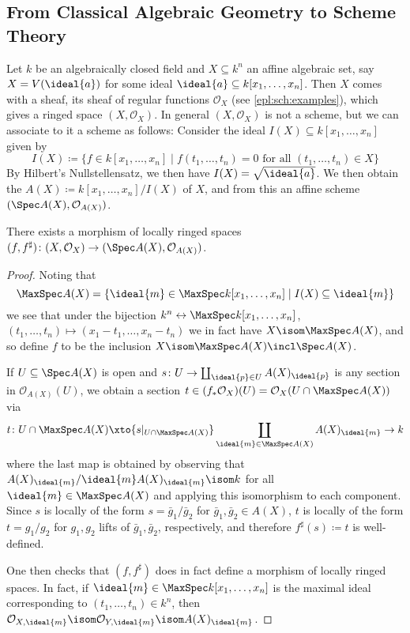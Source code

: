 \documentclass[wip, algebra]{bsteffan-lecturenotes}
\newcommand{\cO}{\mathcal{O}}
\begin{document}
\subsection{From Classical Algebraic Geometry to Scheme Theory}
Let $k$ be an algebraically closed field and $X \subseteq k^n$ an affine algebraic set, say $X = V(\ideal{a})$ for some ideal $\ideal{a} \subseteq k[x_1, \ldots, x_n]$.
Then $X$ comes with a sheaf, its sheaf of regular functions $\cO_X$ (see \cref{epl:sch:examples}), which gives a ringed space $(X, \cO_X)$.
In general $(X, \cO_X)$ is not a scheme, but we can associate to it a scheme as follows:
Consider the ideal $I(X) \subseteq k[x_1, \ldots, x_n]$ given by 
\begin{equation*}
	I(X) \coloneq \{f \in k[x_1, \ldots, x_n] \mid f(t_1, \ldots, t_n) = 0 \text{ for all } (t_1, \ldots, t_n) \in X\}
\end{equation*}
By Hilbert's Nullstellensatz, we then have $I(X) = \sqrt{\ideal{a}}$.
We then obtain the  $A(X) \coloneq k[x_1, \ldots, x_n] / I(X)$ of $X$, and from this an affine scheme $(\Spec A(X), \cO_{A(X)})$.
\begin{proposition}
	There exists a morphism of locally ringed spaces $(f, f^\sharp)\colon (X, \cO_X) \to (\Spec A(X), \cO_{A(X)})$.
\end{proposition}
\begin{proof}
	Noting that 
	\begin{equation*}
		\MaxSpec A(X) = \{\ideal{m} \in \MaxSpec k[x_1, \ldots, x_n] \mid I(X) \subseteq \ideal{m}\}
	\end{equation*}
	we see that under the bijection $k^n \leftrightarrow \MaxSpec k[x_1, \ldots, x_n]$, $(t_1, \ldots, t_n) \mapsto (x_1 - t_1, \ldots, x_n - t_n)$ we in fact have $X \isom \MaxSpec A(X)$, and so define $f$ to be the inclusion $X \isom \MaxSpec A(X) \incl \Spec A(X)$.

	If $U \subseteq \Spec A(X)$ is open and $s\colon U \to \coprod_{\ideal{p} \in U} A(X)_{\ideal{p}}$ is any section in $\cO_{A(X)}(U)$, we obtain a section $t \in (f_* \cO_X)(U) = \cO_X(U \cap \MaxSpec A(X))$ via
	\begin{equation*}
		t\colon U \cap \MaxSpec A(X) \xto{s|_{U \cap \MaxSpec A(X)}} \coprod_{\ideal{m} \in \MaxSpec A(X)} A(X)_{\ideal{m}} \to k
	\end{equation*}
	where the last map is obtained by observing that $A(X)_{\ideal{m}} / \ideal{m} A(X)_{\ideal{m}} \isom k$ for all $\ideal{m} \in \MaxSpec A(X)$ and applying this isomorphism to each component.
	Since $s$ is locally of the form $s = \bar{g}_1 / \bar{g}_2$ for $\bar{g}_1, \bar{g}_2 \in A(X)$, $t$ is locally of the form $t = g_1 / g_2$ for $g_1, g_2$ lifts of $\bar{g}_1, \bar{g}_2$, respectively, and therefore $f^\sharp(s) \coloneq t$ is well-defined.

	One then checks that $(f, f^\sharp)$ does in fact define a morphism of locally ringed spaces.
	In fact, if $\ideal{m} \in \MaxSpec k[x_1, \ldots, x_n]$ is the maximal ideal corresponding to $(t_1, \ldots, t_n) \in k^n$, then $\cO_{X, \ideal{m}} \isom \cO_{Y, \ideal{m}} \isom A(X)_{\ideal{m}}$.
\end{proof}
\end{document}

